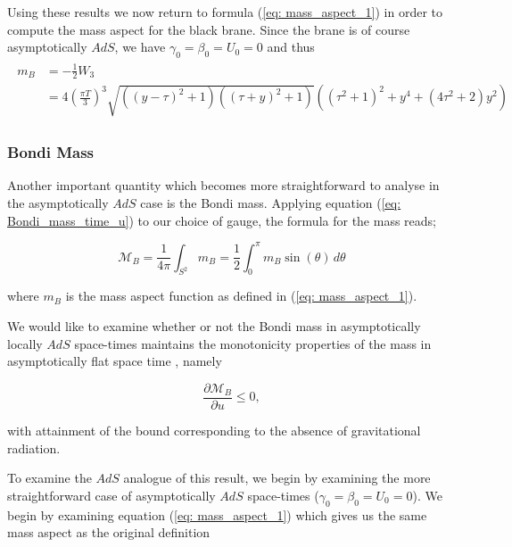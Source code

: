 \documentclass[a4paper,11pt]{article}
\numberwithin{equation}{section}
\begin{document}
Using these results we now return to formula (\ref{eq: mass_aspect_1}) in order to compute the mass aspect for the black brane. Since the brane is of course asymptotically $AdS$, we have $\gamma_0=\beta_0=U_0=0$ and thus 
\begin{align}
\begin{split}
m_B&=-\frac{1}{2}W_3\\ 
&=4\left( \frac{\pi T}{3} \right)^3 \sqrt{\left((y-\tau )^2+1\right) \left((\tau +y)^2+1\right)} \left(\left(\tau ^2+1\right)^2+y^4+\left(4 \tau ^2+2\right) y^2\right)
\end{split}
\end{align}

\subsubsection{Bondi Mass}

Another important quantity which becomes more straightforward to analyse in the asymptotically $AdS$ case is the Bondi mass. Applying equation (\ref{eq: Bondi_mass_time_u}) to our choice of gauge, the formula for the mass reads;

\begin{equation} \label{eq: mass_formula}
\mathcal{M}_{B}=\frac{1}{4\pi} \int_{S^2} m_B =\frac{1}{2} \int_{0}^{\pi} m_B \sin(\theta) \, d\theta 
\end{equation}

\noindent where $m_B$ is the mass aspect function as defined in (\ref{eq: mass_aspect_1}). \par

We would like to examine whether or not the Bondi mass in asymptotically locally $AdS$ space-times maintains the monotonicity properties of the mass in asymptotically flat space time \cite{Bondi:1962px, Sachs:1962wk}, namely

\begin{equation}
\frac{ \partial \mathcal{M}_B }{\partial u} \leq 0 ,
\end{equation}

\noindent with attainment of the bound corresponding to the absence of gravitational radiation. \par 

To examine the $AdS$ analogue of this result, we begin by examining the more straightforward case of asymptotically $AdS$ space-times ($\gamma_0=\beta_0=U_0=0$). We begin by examining equation (\ref{eq: mass_aspect_1}) which gives us the same mass aspect as the original definition
\end{document}
